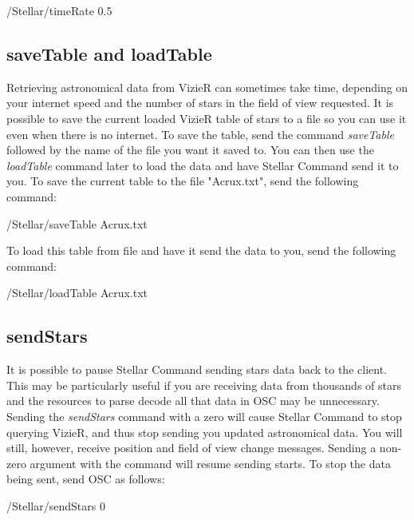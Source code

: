 \begin{syntax}	
	\medskip
	/Stellar/timeRate 0.5
	\medskip
\end{syntax}

\subsection{saveTable and loadTable}   
Retrieving astronomical data from VizieR can sometimes take time, depending on your internet speed and the number of stars in the field of view requested. It is possible to save the current loaded VizieR table of stars to a file so you can use it even when there is no internet. To save the table, send the command \textit{saveTable} followed by the name of the file you want it saved to. You can then use the \textit{loadTable} command later to load the data and have Stellar Command send it to you.
To save the current table to the file "Acrux.txt", send the following command:
 
 \begin{syntax}	
 	\medskip
 	/Stellar/saveTable Acrux.txt
 	\medskip
 \end{syntax}

To load this table from file and have it send the data to you, send the following command:
 \begin{syntax}	
	\medskip
	/Stellar/loadTable Acrux.txt
	\medskip
\end{syntax}

\subsection{sendStars} 
It is possible to pause Stellar Command sending stars data back to the client. This may be particularly useful if you are receiving data from thousands of stars and the resources to parse decode all that data in OSC may be unnecessary. Sending the \textit{sendStars} command with a zero will cause Stellar Command to stop querying VizieR, and thus stop sending you updated astronomical data. You will still, however, receive position and field of view change messages. Sending a non-zero argument with the command will resume sending starts. To stop the data being sent, send OSC as follows:

 \begin{syntax}	
	\medskip
	/Stellar/sendStars 0
	\medskip
\end{syntax}  

